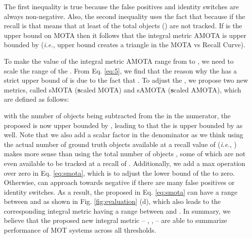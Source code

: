 \documentclass[letterpaper, 10 pt, conference]{ieeeconf}
\begin{document}
\vspace{-0.35cm}

\noindent The first inequality is true because the false positives  and identity switches  are always non-negative. Also, the second inequality uses the fact that  because if the recall is  that means that at least  of the total objects () are not tracked. If  is the upper bound on MOTA then it follows that the integral metric AMOTA is upper bounded by  (\emph{i.e.}, upper bound  creates a triangle in the MOTA vs Recall Curve).

To make the value of the integral metric AMOTA range from  to , we need to scale the range of the . From Eq. \ref{eq:5}, we find that the reason why the  has a strict upper bound of  is due to the fact that . To adjust the , we propose two new metrics, called sMOTA (\textbf{s}caled MOTA) and sAMOTA (\textbf{s}caled AMOTA), which are defined as follows:
\vspace{-0.1cm}

\vspace{-0.2cm}

\noindent with the number of objects  being subtracted from the  in the numerator, the proposed  is now upper bounded by , leading to that the  is upper bounded by  as well. Note that we also add a scalar factor  in the denominator as we think using the actual number of ground truth objects available at a recall value of  (\emph{i.e.}, ) makes more sense than using the total number of objects , some of which are not even available to be tracked at a recall of . Additionally, we add a max operation over zero in Eq. \ref{eq:smota}, which is to adjust the lower bound of the  to zero. Otherwise,  can approach towards negative if there are many false positives or identity switches. As a result, the proposed  in Eq. \ref{eq:smota} can have a range between  and  as shown in Fig. \ref{fig:evaluation} (d), which also leads to the corresponding integral metric  having a range between  and . In summary, we believe that the proposed new integral metric -- , ,  -- are able to summarize performance of MOT systems across all thresholds.
\end{document}
